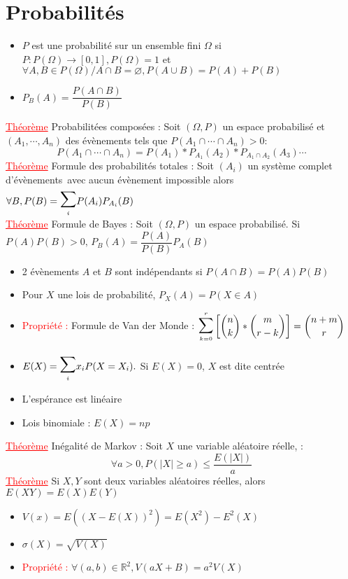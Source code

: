\documentclass[a4paper, 11pts, french]{article}
\newcommand{\R}{\mathbb{R}}
\newcommand{\sce}{système complet d'évènements}
\newcommand{\si}{\sigma}
\newcommand{\Om}{\Omega}
\newcommand{\thm}{\textcolor{red}{\underline{Théorème} }}
\newcommand{\ppt}{\textcolor{red}{Propriété : }}
\newcommand{\ssum}[2]{\vcenter{\hbox{\scaleto[4ex]{\displaystyle\sum_{\scriptscriptstyle #1}^{\scriptscriptstyle #2}}{7ex}}}}
\begin{document}
	 
	  \section{Probabilités}
	 \begin{itemize}
		\item $P$ est une probabilité sur un ensemble fini $\Om$ si $P : P(\Om)\rightarrow [0,1], P(\Om)=1$ et $\forall A,B \in P(\Om)/A\cap B =\varnothing, P(A\cup B)=P(A)+P(B)$
		\item $P_B(A)=\dfrac{P(A\cap B)}{P(B)}$
	 \end{itemize}
	
	 \thm Probabilitées composées : Soit $(\Om,P)$ un espace probabilisé et \((A_1,\cdots,A_n)\) des évènements tels que \(P(A_1\cap\cdots\cap A_n)>0\):
	  \[P(A_1\cap\cdots\cap A_n)=P(A_1)*P_{A_1}(A_2)*P_{A_1\cap A_2}(A_3)\cdots\]
	 \thm Formule des probabilités totales : Soit $(A_i)$ un \sce \, avec aucun évènement impossible alors $\forall B, P(B)=\ssum{i}{}P(A_i)P_{A_i}(B)$ \\
	 \thm Formule de Bayes : Soit $(\Om,P)$ un espace probabilisé. Si ${P(A)P(B)>0,} \, {P_B(A)=\dfrac{P(A)}{P(B)}P_A(B)}$
	 
	  \begin{itemize}
		\item 2 évènements $A$ et $B$ sont indépendants si $P(A\cap B)=P(A)P(B)$
		\item Pour $X$ une lois de probabilité, $P_X(A)=P(X\in A)$
		\item \ppt Formule de Van der Monde : $\ssum{k=0}{r} \left[\dbinom{n}{k}*\dbinom{m}{r-k}\right]=\dbinom{n+m}{r}$
		\item $E(X)=\ssum{i}{}x_iP(X=X_i).$ Si $E(X)=0$, $X$ est dite centrée
		\item L'espérance est linéaire
		\item Lois binomiale : $E(X)=np$
	 \end{itemize}
	
	 \thm Inégalité de Markov : Soit $X$ une variable aléatoire réelle,  :
	 	\[\forall a>0, {P(|X|\geqslant a)\leqslant \frac{E(|X|)}{a}}\]
	 \thm Si $X,Y$ sont deux variables aléatoires réelles, alors $E(XY)=E(X)E(Y)$
	 
	  \begin{itemize}
		\item $V(x)=E((X-E(X))^2)=E(X^2)-E^2(X)$
		\item $\si(X)=\sqrt{V(X)}$
		\item \ppt $\forall (a,b) \in \R^2, V(aX+B)=a^2V(X)$
	 \end{itemize}
	
\end{document}
